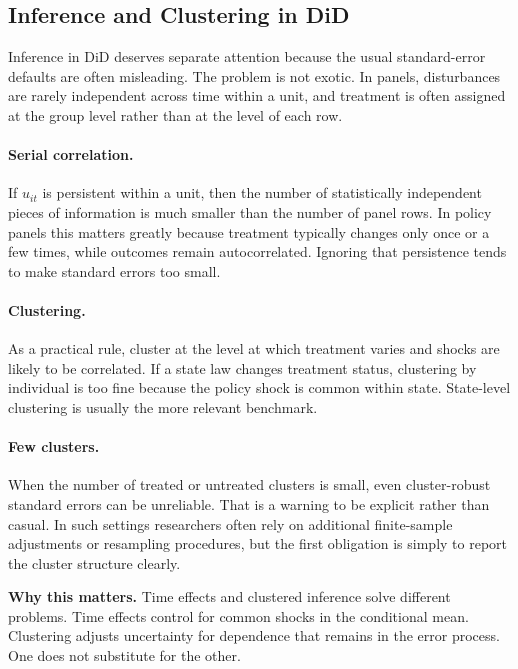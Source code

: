 \subsection{Inference and Clustering in DiD}
Inference in \ac{DiD} deserves separate attention because the usual standard-error defaults are often misleading. The problem is not exotic. In panels, disturbances are rarely independent across time within a unit, and treatment is often assigned at the group level rather than at the level of each row.

\paragraph{Serial correlation.}
If $u_{it}$ is persistent within a unit, then the number of statistically independent pieces of information is much smaller than the number of panel rows. In policy panels this matters greatly because treatment typically changes only once or a few times, while outcomes remain autocorrelated. Ignoring that persistence tends to make standard errors too small.

\paragraph{Clustering.}
As a practical rule, cluster at the level at which treatment varies and shocks are likely to be correlated. If a state law changes treatment status, clustering by individual is too fine because the policy shock is common within state. State-level clustering is usually the more relevant benchmark.

\paragraph{Few clusters.}
When the number of treated or untreated clusters is small, even cluster-robust standard errors can be unreliable. That is a warning to be explicit rather than casual. In such settings researchers often rely on additional finite-sample adjustments or resampling procedures, but the first obligation is simply to report the cluster structure clearly.

\begin{boxD}
\textbf{Why this matters.}
Time effects and clustered inference solve different problems. Time effects control for common shocks in the conditional mean. Clustering adjusts uncertainty for dependence that remains in the error process. One does not substitute for the other.
\end{boxD}


